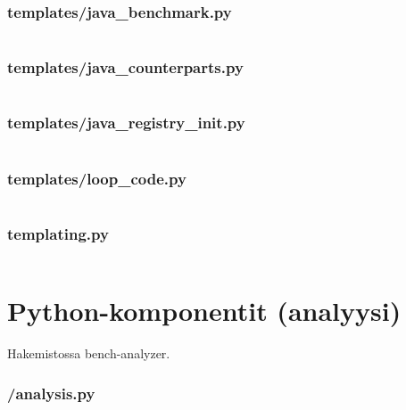 \documentclass[a4paper,12pt]{article}
\begin{document}
\subsubsection{templates/java\_benchmark.py}
\inputminted[fontsize=\small, linenos, numbersep=5pt, tabsize=4, frame=topline,framesep=0.8cm]{python}{/home/tituomin/StudioProjects/nativebenchmark/script/templates/java_benchmark.py}
\vspace{1cm}
\subsubsection{templates/java\_counterparts.py}
\inputminted[fontsize=\small, linenos, numbersep=5pt, tabsize=4, frame=topline,framesep=0.8cm]{python}{/home/tituomin/StudioProjects/nativebenchmark/script/templates/java_counterparts.py}
\vspace{1cm}
\subsubsection{templates/java\_registry\_init.py}
\inputminted[fontsize=\small, linenos, numbersep=5pt, tabsize=4, frame=topline,framesep=0.8cm]{python}{/home/tituomin/StudioProjects/nativebenchmark/script/templates/java_registry_init.py}
\vspace{1cm}
\subsubsection{templates/loop\_code.py}
\inputminted[fontsize=\small, linenos, numbersep=5pt, tabsize=4, frame=topline,framesep=0.8cm]{python}{/home/tituomin/StudioProjects/nativebenchmark/script/templates/loop_code.py}
\vspace{1cm}
\subsubsection{templating.py}
\inputminted[fontsize=\small, linenos, numbersep=5pt, tabsize=4, frame=topline,framesep=0.8cm]{python}{/home/tituomin/StudioProjects/nativebenchmark/script/templating.py}
\newpage
\section{Python-komponentit (analyysi)}
Hakemistossa bench-analyzer.
\vspace{1cm}
\subsubsection{/analysis.py}
\inputminted[fontsize=\small, linenos, numbersep=5pt, tabsize=4, frame=topline,framesep=0.8cm]{python}{/home/tituomin/StudioProjects/bench-analyzer/bench-analyzer/analysis.py}
\vspace{1cm}
\end{document}
